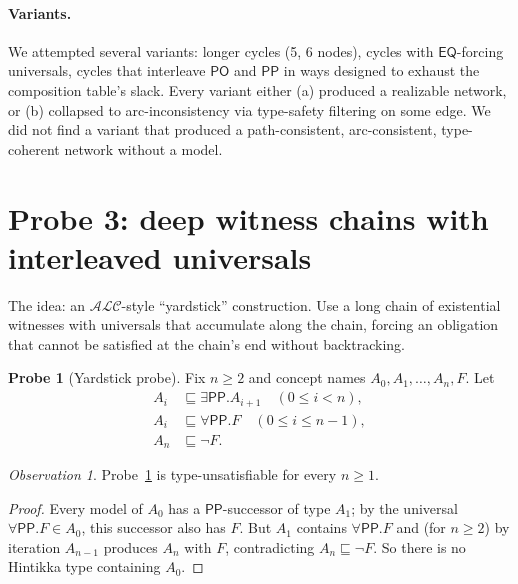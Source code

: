 \documentclass[11pt]{article}
\theoremstyle{definition}
\newtheorem{probe}[theorem]{Probe}
\theoremstyle{remark}
\newtheorem{observation}[theorem]{Observation}
\newcommand{\PO}{\mathsf{PO}}
\newcommand{\PP}{\mathsf{PP}}
\newcommand{\EQ}{\mathsf{EQ}}
\begin{document}
\paragraph{Variants.}  We attempted several variants: longer
cycles (5, 6 nodes), cycles with $\EQ$-forcing universals,
cycles that interleave $\PO$ and $\PP$ in ways designed to
exhaust the composition table's slack.  Every variant either
(a) produced a realizable network, or (b) collapsed to arc-inconsistency
via type-safety filtering on some edge.  We did not find a variant
that produced a path-consistent, arc-consistent, type-coherent
network without a model.

\section{Probe 3: deep witness chains with interleaved universals}
\label{sec:probe3}

The idea: an $\mathcal{ALC}$-style ``yardstick'' construction.  Use
a long chain of existential witnesses with universals that accumulate
along the chain, forcing an obligation that cannot be satisfied at
the chain's end without backtracking.

\begin{probe}[Yardstick probe]
\label{probe:ys}
Fix $n \geq 2$ and concept names $A_0, A_1, \ldots, A_n, F$.  Let
\begin{align*}
  A_i &\sqsubseteq \exists \PP. A_{i+1} \quad (0 \leq i < n), \\
  A_i &\sqsubseteq \forall \PP. F \quad (0 \leq i \leq n-1), \\
  A_n &\sqsubseteq \neg F.
\end{align*}
\end{probe}

\begin{observation}
\label{obs:ys-type}
Probe~\ref{probe:ys} is type-unsatisfiable for every $n \geq 1$.
\end{observation}

\begin{proof}
Every model of $A_0$ has a $\PP$-successor of type $A_1$; by the
universal $\forall \PP. F \in A_0$, this successor also has $F$.
But $A_1$ contains $\forall \PP. F$ and (for $n \geq 2$) by
iteration $A_{n-1}$ produces $A_n$ with $F$, contradicting
$A_n \sqsubseteq \neg F$.  So there is no Hintikka type containing
$A_0$.
\end{proof}
\end{document}
